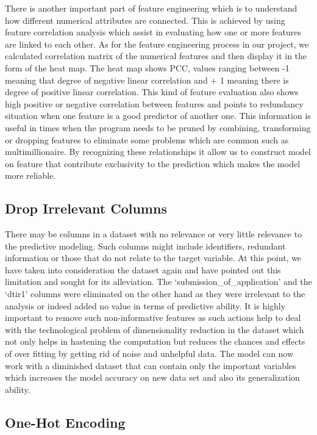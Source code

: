 \documentclass[12pt, a4paper,oneside]{book}
\numberwithin{equation}{section}
\begin{document}
There is another important part of feature engineering which is to understand how different numerical attributes are connected. This is achieved by using feature correlation analysis which assist in evaluating how one or more features are linked to each other. As for the feature engineering process in our project, we calculated correlation matrix of the numerical features and then display it in the form of the heat map. The heat map shows PCC, values ranging between -1 meaning that degree of negative linear correlation and + 1 meaning there is degree of positive linear correlation. This kind of feature evaluation also shows high positive or negative correlation between features and points to redundancy situation when one feature is a good predictor of another one. This information is useful in times when the program needs to be pruned by combining, transforming or dropping features to eliminate some problems which are common such as multimillionaire. By recognizing these relationships it allow us to construct model on feature that contribute exclusivity to the prediction which makes the model more reliable. 

\subsection{Drop Irrelevant Columns}

There may be columns in a dataset with no relevance or very little relevance to the predictive modeling. Such columns might include identifiers, redundant information or those that do not relate to the target variable. At this point, we have taken into consideration the dataset again and have pointed out this limitation and sought for its alleviation. The ‘submission\_of\_application’ and the ‘dtir1’ columns were eliminated on the other hand as they were irrelevant to the analysis or indeed added no value in terms of predictive ability. It is highly important to remove such non-informative features as such actions help to deal with the technological problem of dimensionality reduction in the dataset which not only helps in hastening the computation but reduces the chances and effects of over fitting by getting rid of noise and unhelpful data. The model can now work with a diminished dataset that can contain only the important variables which increases the model accuracy on new data set and also its generalization ability.

\subsection{One-Hot Encoding}
\end{document}
